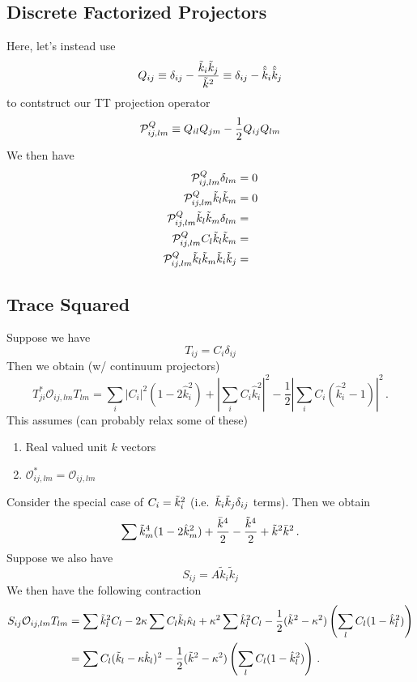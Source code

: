 \documentclass{revtex4}
\begin{document}
\subsection{Discrete Factorized Projectors}
Here, let's instead use
\begin{equation}
  Q_{ij} \equiv \delta_{ij} - \frac{\tilde{k}_i\tilde{k}_j}{\tilde{k}^2} \equiv \delta_{ij} - \hat{\tilde{k}}_i\hat{\tilde{k}}_j
\end{equation}
to contstruct our TT projection operator
\begin{equation}
  \mathcal{P}^Q_{ij,lm} \equiv Q_{il}Q_{jm} - \frac{1}{2}Q_{ij}Q_{lm}
\end{equation}
We then have
\begin{subequations}
\begin{align}
  \mathcal{P}^Q_{ij,lm}\delta_{lm} &= 0 \\
  \mathcal{P}^Q_{ij,lm}\tilde{k}_l\tilde{k}_m &= 0 \\
  \mathcal{P}^Q_{ij,lm}\tilde{k}_l\tilde{k}_m\delta_{lm} &= \\
  \mathcal{P}^Q_{ij,lm}C_l\tilde{k}_l\tilde{k}_m &= \\
  \mathcal{P}^Q_{ij,lm}\tilde{k}_l\tilde{k}_m\tilde{k}_i\tilde{k}_j &= 
\end{align}
\end{subequations}

\subsection{Trace Squared}
Suppose we have
\begin{equation}
  T_{ij} = C_i\delta_{ij}
\end{equation}
Then we obtain (w/ continuum projectors)
\begin{equation}
  T_{ji}^*\mathcal{O}_{ij,lm}T_{lm} = \sum_i |C_i|^2(1-2\hat{k}_i^2) + \left|\sum_i C_i\hat{k}_i^2\right|^2 - \frac{1}{2}\left|\sum_i C_i(\hat{k}_i^2-1)\right|^2 \, .
\end{equation}
This assumes (can probably relax some of these)
\begin{enumerate}
\item Real valued unit $k$ vectors
\item $\mathcal{O}_{ij,lm}^* = \mathcal{O}_{ij,lm}$
\end{enumerate}
Consider the special case of $C_i = \tilde{k}_i^2$ (i.e.\ $\tilde{k}_i\tilde{k}_j\delta_{ij}$ terms).
Then we obtain
\begin{equation}
  \sum \tilde{k}_m^4(1-2\hat{k}_m^2) + \frac{\bar{k}^4}{2} - \frac{\tilde{k}^4}{2} + \tilde{k}^2\bar{k}^2 \, .
\end{equation}
Suppose we also have
\begin{equation}
  S_{ij} = A\tilde{k}_i\tilde{k}_j
\end{equation}
We then have the following contraction
\begin{align}
  S_{ij}\mathcal{O}_{ij,lm}T_{lm} &= \sum \tilde{k}_l^2C_l - 2\kappa\sum C_l\tilde{k}_l\hat{\kappa}_l + \kappa^2\sum\hat{k}_l^2C_l - \frac{1}{2}(\tilde{k}^2-\kappa^2)\left(\sum_l C_l(1-\hat{k}_l^2)\right) \\
  &= \sum C_l(\tilde{k}_l-\kappa\hat{k}_l)^2 - \frac{1}{2}(\tilde{k}^2-\kappa^2)\left(\sum_l C_l(1-\hat{k}_l^2)\right) \, .
\end{align}
\end{document}
